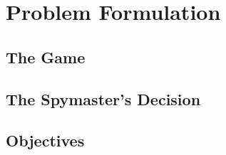 \section{Problem Formulation}\label{sec:problem}

\subsection{The Game}

\subsection{The Spymaster's Decision}

\subsection{Objectives}
